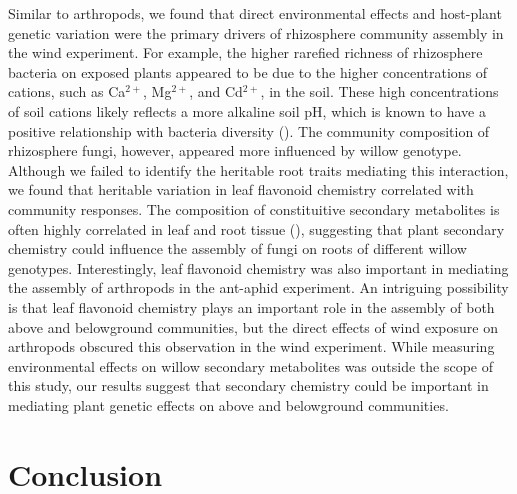 \documentclass[11pt]{article}
\begin{document}
Similar to arthropods, we found that direct environmental effects and host-plant genetic variation were the primary drivers of rhizosphere community assembly in the wind experiment. For example, the higher rarefied richness of rhizosphere bacteria on exposed plants appeared to be due to the higher concentrations of cations, such as Ca$^{2+}$, Mg$^{2+}$, and Cd$^{2+}$, in the soil. These high concentrations of soil cations likely reflects a more alkaline soil pH, which is known to have a positive relationship with bacteria diversity (\citealt{fierer2006diversity}). The community composition of rhizosphere fungi, however, appeared more influenced by willow genotype. Although we failed to identify the heritable root traits mediating this interaction, we found that heritable variation in leaf flavonoid chemistry correlated with community responses. The composition of constituitive secondary metabolites is often highly correlated in leaf and root tissue (\citealt{kaplan2008constitutive}), suggesting that plant secondary chemistry could influence the assembly of fungi on roots of different willow genotypes. Interestingly, leaf flavonoid chemistry was also important in mediating the assembly of arthropods in the ant-aphid experiment. An intriguing possibility is that leaf flavonoid chemistry plays an important role in the assembly of both above and belowground communities, but the direct effects of wind exposure on arthropods obscured this observation in the wind experiment. While measuring environmental effects on willow secondary metabolites was outside the scope of this study, our results suggest that secondary chemistry could be important in mediating plant genetic effects on above and belowground communities.



\section*{Conclusion}
\end{document}
